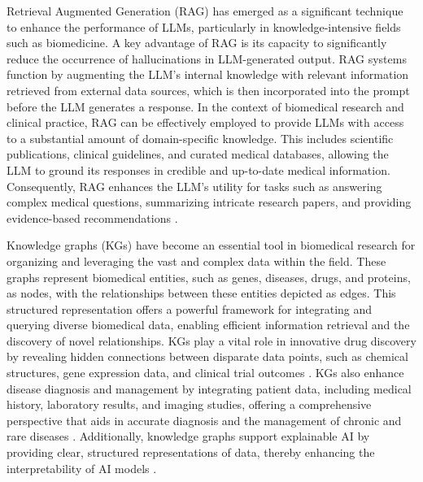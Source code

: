 \documentclass{article}
\begin{document}
Retrieval Augmented Generation (RAG) has emerged as a significant technique to enhance the performance of LLMs, particularly in knowledge-intensive fields such as biomedicine. A key advantage of RAG is its capacity to significantly reduce the occurrence of hallucinations in LLM-generated output. RAG systems function by augmenting the LLM's internal knowledge with relevant information retrieved from external data sources, which is then incorporated into the prompt before the LLM generates a response. In the context of biomedical research and clinical practice, RAG can be effectively employed to provide LLMs with access to a substantial amount of domain-specific knowledge. This includes scientific publications, clinical guidelines, and curated medical databases, allowing the LLM to ground its responses in credible and up-to-date medical information. Consequently, RAG enhances the LLM's utility for tasks such as answering complex medical questions, summarizing intricate research papers, and providing evidence-based recommendations \cite{bora2024systematic}. 

Knowledge graphs (KGs) have become an essential tool in biomedical research for organizing and leveraging the vast and complex data within the field. These graphs represent biomedical entities, such as genes, diseases, drugs, and proteins, as nodes, with the relationships between these entities depicted as edges. This structured representation offers a powerful framework for integrating and querying diverse biomedical data, enabling efficient information retrieval and the discovery of novel relationships. KGs play a vital role in innovative drug discovery by revealing hidden connections between disparate data points, such as chemical structures, gene expression data, and clinical trial outcomes \cite{zeng2022toward}. KGs also enhance disease diagnosis and management by integrating patient data, including medical history, laboratory results, and imaging studies, offering a comprehensive perspective that aids in accurate diagnosis and the management of chronic and rare diseases \cite{gao2025leveraging}. Additionally, knowledge graphs support explainable AI by providing clear, structured representations of data, thereby enhancing the interpretability of AI models \cite{rajabi2022knowledge}.
\end{document}
